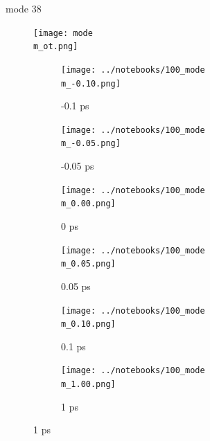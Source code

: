 \documentclass{beamer}
\begin{document}
\renewcommand\m{38}
\begin{frame}{mode \m}
	\vspace{\vh mm}
	\begin{figure}
		\centering
		\texttt{[image: mode\\m\_ot.png]}
	\end{figure}
	\begin{figure}
		\centering
		\begin{subfigure}[b]{\w\textwidth}
			\centering
			\texttt{[image: ../notebooks/100\_mode\\m\_-0.10.png]}
			\caption{-0.1 ps}
		\end{subfigure}
		\begin{subfigure}[b]{\w\textwidth}
			\centering
			\texttt{[image: ../notebooks/100\_mode\\m\_-0.05.png]}
			\caption{-0.05 ps}
		\end{subfigure}
		\begin{subfigure}[b]{\w\textwidth}
			\centering
			\texttt{[image: ../notebooks/100\_mode\\m\_0.00.png]}
			\caption{0 ps}
		\end{subfigure}
		\begin{subfigure}[b]{\w\textwidth}
			\centering
			\texttt{[image: ../notebooks/100\_mode\\m\_0.05.png]}
			\caption{0.05 ps}
		\end{subfigure}
		\begin{subfigure}[b]{\w\textwidth}
			\centering
			\texttt{[image: ../notebooks/100\_mode\\m\_0.10.png]}
			\caption{0.1 ps}
		\end{subfigure}
		\begin{subfigure}[b]{\w\textwidth}
			\centering
			\texttt{[image: ../notebooks/100\_mode\\m\_1.00.png]}
			\caption{1 ps}
		\end{subfigure}
	\end{figure}
\end{frame}
\end{document}
